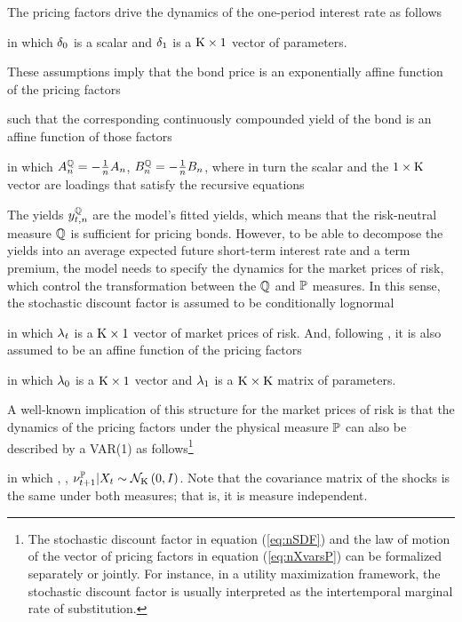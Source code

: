 {The pricing factors drive the dynamics of the one-period interest rate as follows 
	
\noindent in which \(\delta_{0}\) is a scalar and \(\delta_{1}\) is a \(\mathrm{K} \times 1\) vector of parameters.

These assumptions imply that the bond price is an exponentially affine function of the pricing factors
	
\noindent such that the corresponding continuously compounded yield of the bond is an affine function of those factors
	
\noindent in which \(A_{n}^{\mathbb{Q}} = - \frac{1}{n} A_{n}\), \(B_{n}^{\mathbb{Q}} = - \frac{1}{n} B_{n}\), where in turn the scalar  \!and the \(1 \times \mathrm{K}\) vector  are loadings that satisfy the recursive equations
	
	\vspace{-.7cm}
	
The yields \(y_{t,n}^{\mathbb{Q}}\) are the model's fitted yields, which means that the risk-neutral measure \(\mathbb{Q}\) is sufficient for pricing bonds. 
However, to be able to decompose the yields into an average expected future short-term interest rate and a term premium, the model needs to specify the dynamics for the market prices of risk, which control the transformation between the \(\mathbb{Q}\) and \(\mathbb{P}\) measures. 
In this sense, the stochastic discount factor is assumed to be conditionally lognormal

\noindent in which \(\lambda_{t}\) is a \(\mathrm{K} \times 1\) vector of market prices of risk. And, following \cite{Duffee:2002}, it is also assumed to be an affine function of the pricing factors
	
\noindent in which \(\lambda_{0}\) is a \(\mathrm{K} \times 1\) vector and \(\lambda_{1}\) is a \(\mathrm{K} \times \mathrm{K}\) matrix of parameters.

A well-known implication of this structure for the market prices of risk is that the dynamics of the pricing factors under the physical measure \(\mathbb{P}\) can also be described by a VAR(1) as follows\footnote{ The stochastic discount factor in equation (\ref{eq:nSDF}) and the law of motion of the vector of pricing factors in equation (\ref{eq:nXvarsP}) can be formalized separately or jointly. For instance, in a utility maximization framework, the stochastic discount factor is usually interpreted as the intertemporal marginal rate of substitution.} %
	
\noindent in which , ,  \(\nu_{t+1}^{\mathbb{P}} | X_{t} \sim \mathcal{N}_{\mathrm{K}} \left(0,I\right)\). Note that the covariance matrix of the shocks is the same under both measures; that is, it is measure independent. 

}
